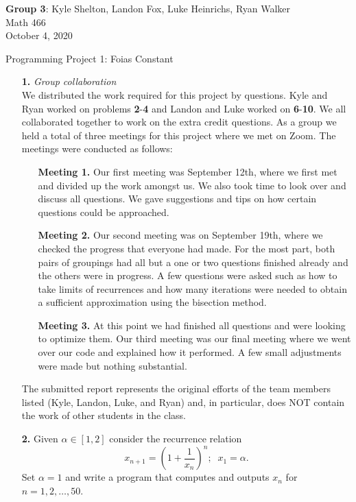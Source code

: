 \documentclass[ 12pt ]{article}
\begin{document}
\noindent \textbf{Group 3}: Kyle Shelton, Landon Fox, Luke Heinrichs, Ryan Walker \\
\noindent Math 466 \\
\noindent October 4, 2020

\begin{center}
	\Large Programming Project 1: Foias Constant
\end{center}

\begin{enumerate}
	\item[\textbf{1.}] \textit{Group collaboration} \\
		We distributed the work required for this project by questions. Kyle and Ryan worked on problems \textbf{2}-\textbf{4} and Landon and Luke worked on \textbf{6}-\textbf{10}.
		We all collaborated together to work on the extra credit questions. As a group we held a total of three meetings for this project where we met on Zoom. The meetings were
		conducted as follows:
		\begin{enumerate}
			\item[\textbf{Meeting 1.}] Our first meeting was September 12th, where we first met and divided up the work amongst us. We also took time to look over and discuss all
				questions. We gave suggestions and tips on how certain questions could be approached.
			\item[\textbf{Meeting 2.}] Our second meeting was on September 19th, where we checked the progress that everyone had made. For the most part, both pairs of groupings had
				all but a one or two questions finished already and the others were in progress. A few questions were asked such as how to take limits of recurrences and how many
				iterations were needed to obtain a sufficient approximation using the bisection method.
			\item[\textbf{Meeting 3.}] At this point we had finished all questions and were looking to optimize them. Our third meeting was our final meeting where we went over our
				code and explained how it performed. A few small adjustments were made but nothing substantial.
		\end{enumerate}
		The submitted report represents the original efforts of the team members listed (Kyle, Landon, Luke, and Ryan) and, in particular, does NOT contain the work of other students
		in the class.

	\item[\textbf{2.}] Given $\alpha \in [1, 2]$ consider the recurrence relation $$x_{n+1} = \left ( 1 + \frac{1}{x_n} \right )^n;\;\; x_1 = \alpha.$$
		Set $\alpha = 1$ and write a program that computes and outputs $x_n$ for $n = 1, 2, \hdots, 50$.


\end{enumerate}
\end{document}
